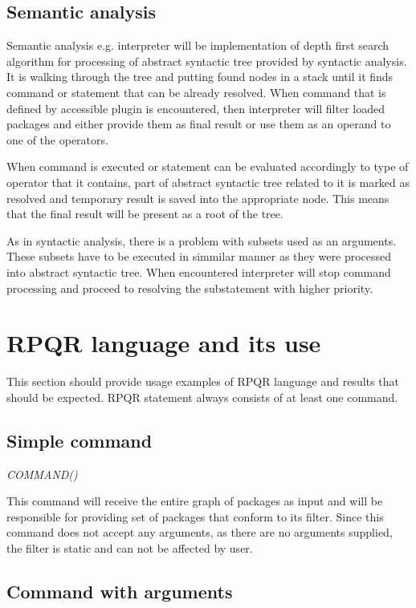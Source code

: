 \subsection*{Semantic analysis}
Semantic analysis e.g. interpreter will be implementation of depth first search algorithm for processing
of abstract syntactic tree provided by syntactic analysis. It is walking through the tree and putting
found nodes in a stack until it finds command or statement that can be already resolved. When command
that is defined by accessible plugin is encountered, then interpreter will filter loaded packages and
either provide them as final result or use them as an operand to one of the operators.

When command is executed or statement can be evaluated accordingly to type of operator that it
contains, part of abstract syntactic tree related to it is marked as resolved and temporary result
is saved into the appropriate node. This means that the final result will be present as a root
of the tree.

As in syntactic analysis, there is a problem with subsets used as an arguments. These subsets have
to be executed in simmilar manner as they were processed into abstract syntactic tree. When encountered
interpreter will stop command processing and proceed to resolving the substatement with higher priority.

\section{RPQR language and its use}
This section should provide usage examples of RPQR language and results that should be expected.
RPQR statement always consists of at least one command.

\subsection*{Simple command}

\textit{COMMAND()}

This command will receive the entire graph of packages as input and will be responsible for providing
set of packages that conform to its filter. Since this command does not accept any arguments, as there
are no arguments supplied, the filter is static and can not be affected by user.

\subsection*{Command with arguments}


